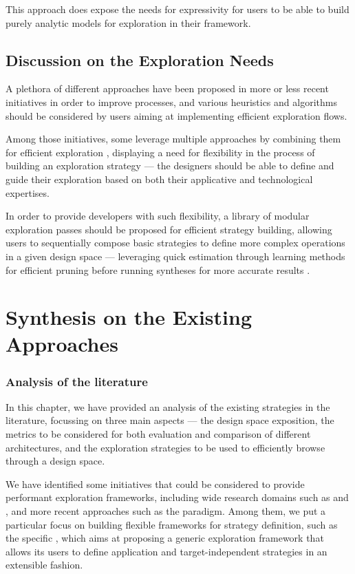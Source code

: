         This approach does expose the needs for expressivity for users to be able to build purely analytic models for exploration in their  framework.

    \subsection{Discussion on the Exploration Needs}
        A plethora of different approaches have been proposed in more or less recent initiatives in order to improve  processes, and various heuristics and algorithms should be considered by users aiming at implementing efficient exploration flows.

        Among those initiatives, some leverage multiple approaches by combining them for efficient exploration \cite{dong_liu_efficient_2016}\cite{bai_boom-explorer_2021}, displaying a need for flexibility in the process of building an exploration strategy ---  the designers should be able to define and guide their exploration based on both their applicative and technological expertises.

        In order to provide developers with such flexibility, a library of modular exploration passes should be proposed for efficient strategy building, allowing users to sequentially compose basic strategies to define more complex  operations in a given design space --- \eg leveraging quick estimation through learning methods for efficient pruning before running syntheses for more accurate results \cite{meng_adaptive_2016}.

\clearpage
\section{Synthesis on the Existing Approaches}
\label{ch.state:sec.synthesis}
    \subsubsection{Analysis of the literature}   
        In this chapter, we have provided an analysis of the existing  strategies in the literature, focussing on three main aspects --- the design space exposition, the metrics to be considered for both evaluation and comparison of different architectures, and the exploration strategies to be used to efficiently browse through a design space.

        We have identified some initiatives that could be considered to provide performant exploration frameworks, including wide research domains such as  and , and more recent approaches such as the  paradigm.
        Among them, we put a particular focus on building flexible frameworks for strategy definition, such as the  specific \eidea{} \cite{barone_multi-objective_2021}, which aims at proposing a generic exploration framework that allows its users to define application and target-independent strategies in an extensible fashion.


